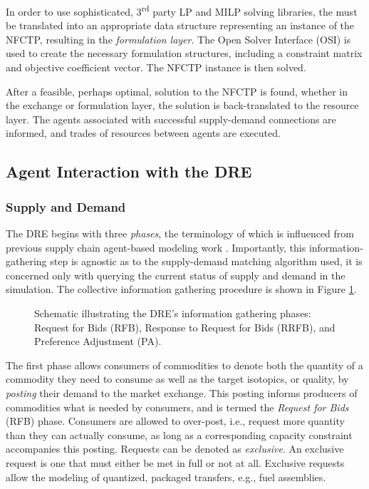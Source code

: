 In order to use sophisticated, 3\textsuperscript{rd} party LP and MILP solving
libraries, the  must be translated into an appropriate data
structure representing an instance of the NFCTP, resulting in the
\textit{formulation layer}. The Open Solver Interface (OSI) \cite{coinosi} is
used to create the necessary formulation structures, including a constraint
matrix and objective coefficient vector. The NFCTP instance is then solved.

After a feasible, perhaps optimal, solution to the NFCTP is found, whether in
the exchange or formulation layer, the solution is back-translated to the
resource layer. The agents associated with successful supply-demand connections
are informed, and trades of resources between agents are executed.

\subsection{Agent Interaction with the DRE}\label{abm:dre:info}

\subsubsection{Supply and Demand}

The DRE begins with three \textit{phases}, the terminology of which is
influenced from previous supply chain agent-based modeling work
\cite{julka_agent-based_2002}. Importantly, this information-gathering step is
agnostic as to the supply-demand matching algorithm used, it is concerned only
with querying the current status of supply and demand in the simulation. The
collective information gathering procedure is shown in Figure
\ref{fig:procedure}.

\begin{figure}
  \centering
  \caption[]{Schematic illustrating the DRE's information
    gathering phases: Request for Bids (RFB), Response to Request for Bids
    (RRFB), and Preference Adjustment (PA).\label{fig:procedure}}
\end{figure}

The first phase allows consumers of commodities to denote both the quantity of a
commodity they need to consume as well as the target isotopics, or quality, by
\textit{posting} their demand to the market exchange. This posting informs
producers of commodities what is needed by consumers, and is termed the
\textit{Request for Bids} (RFB) phase. Consumers are allowed to over-post, i.e.,
request more quantity than they can actually consume, as long as a corresponding
capacity constraint accompanies this posting. Requests can be denoted as
\textit{exclusive}. An exclusive request is one that must either be met in full
or not at all. Exclusive requests allow the modeling of quantized, packaged
transfers, e.g., fuel assemblies. 

